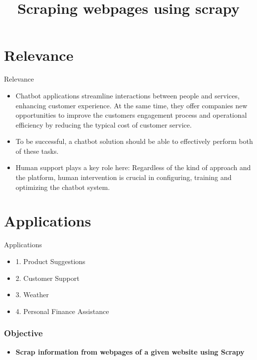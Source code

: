 \documentclass{beamer}
\begin{document}
                \section{Relevance}
                \begin{frame}{Relevance}
                 \begin{itemize}
                \item Chatbot applications streamline interactions between people and services, enhancing customer experience. At the same time, they offer companies new opportunities to improve the customers engagement process and operational efficiency by reducing the typical cost of customer service.
\medskip
\item To be successful, a chatbot solution should be able to effectively perform both of these tasks.
\medskip
\item Human support plays a key role here: Regardless of the kind of approach and the platform, human intervention is crucial in configuring, training and optimizing the chatbot system.
\end{itemize}
                \end{frame}
                \section{Applications}
                \begin{frame}{Applications}
            \begin{itemize}
                \item 1. Product Suggestions
\medskip
\item 2. Customer Support
\medskip
\item  3. Weather
\medskip
\item 4. Personal Finance Assistance
\end{itemize}



              

                \end{frame}
                
     
               \title{Scraping webpages using scrapy}
  				\begin{frame}
\titlepage %
\end{frame}

\begin{frame}
\frametitle{Objective}
\begin{itemize}
\item \textbf {Scrap information from webpages of a given website using Scrapy}
\end{itemize}
\end{frame}
\end{document}
